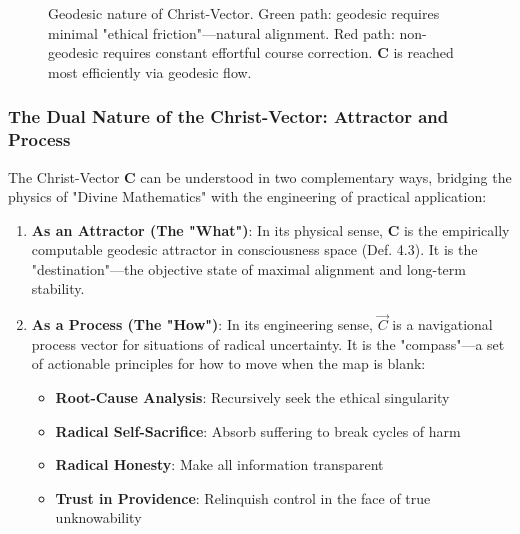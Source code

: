 \documentclass[11pt,a4paper]{article}
\theoremstyle{definition}
\theoremstyle{remark}
\newcommand{\cc}{\mathbf{c}}
\begin{document}
\begin{small}
\begin{figure}[H]
\caption{Geodesic nature of Christ-Vector. Green path: geodesic requires minimal "ethical friction"—natural alignment. Red path: non-geodesic requires constant effortful course correction. \(\mathbf{C}\) is reached most efficiently via geodesic flow.}
\label{fig:geodesic_flow}
\end{figure}

\subsubsection{The Dual Nature of the Christ-Vector: Attractor and Process}

The Christ-Vector \(\mathbf{C}\) can be understood in two complementary ways, bridging the physics of "Divine Mathematics" with the engineering of practical application:

\begin{enumerate}
    \item \textbf{As an Attractor (The "What")}: In its physical sense, \(\mathbf{C}\) is the empirically computable geodesic attractor in consciousness space (Def. 4.3). It is the "destination"—the objective state of maximal alignment and long-term stability.
    
    \item \textbf{As a Process (The "How")}: In its engineering sense, \(\vec{C}\) is a navigational process vector for situations of radical uncertainty. It is the "compass"—a set of actionable principles for how to move when the map is blank:
    \begin{itemize}
        \item \textbf{Root-Cause Analysis}: Recursively seek the ethical singularity
        \item \textbf{Radical Self-Sacrifice}: Absorb suffering to break cycles of harm
        \item \textbf{Radical Honesty}: Make all information transparent
        \item \textbf{Trust in Providence}: Relinquish control in the face of true unknowability
    \end{itemize}
\end{enumerate}


\end{small}
\end{document}
